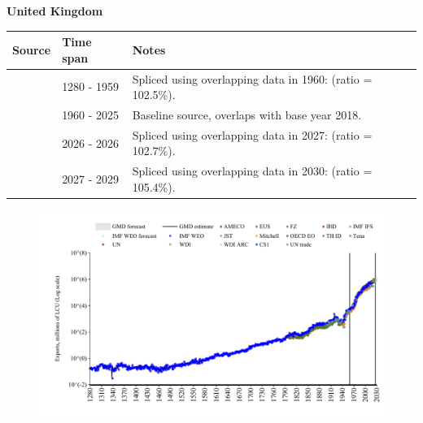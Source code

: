 \documentclass[12pt,a4paper,landscape]{article}
\begin{document}
\begin{adjustbox}{max totalsize={\paperwidth}{\paperheight},center}
\begin{minipage}[t][\textheight][t]{\textwidth}
\vspace*{0.5cm}
{}
\begin{center}
{\Large\bfseries United Kingdom}
\end{center}
\vspace{0.5cm}
\begin{table}[H]
\centering
\small
\begin{tabular}{|l|l|l|}
\hline
\textbf{Source} & \textbf{Time span} & \textbf{Notes} \\
\hline
\rowcolor{white}\cite{CS1_GBR}& 1280 - 1959 &Spliced using overlapping data in 1960: (ratio = 102.5\%).\\
\rowcolor{lightgray}\cite{OECD_EO}& 1960 - 2025 &Baseline source, overlaps with base year 2018.\\
\rowcolor{white}\cite{AMECO}& 2026 - 2026 &Spliced using overlapping data in 2027: (ratio = 102.7\%).\\
\rowcolor{lightgray}\cite{IMF_WEO_forecast}& 2027 - 2029 &Spliced using overlapping data in 2030: (ratio = 105.4\%).\\
\hline
\end{tabular}
\end{table}
\begin{figure}[H]
\centering
\includegraphics[width=\textwidth,height=0.6\textheight,keepaspectratio]{graphs/GBR_exports.pdf}
\end{figure}
\end{minipage}
\end{adjustbox}
\end{document}
